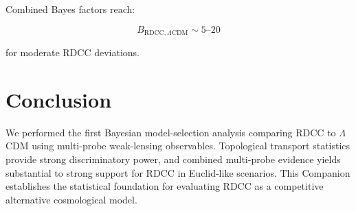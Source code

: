 \documentclass[11pt,a4paper]{article}
\begin{document}
Combined Bayes factors reach:



\[
    B_{\mathrm{RDCC},\Lambda\mathrm{CDM}} \sim 5\text{--}20
\]



for moderate RDCC deviations.
\section{Conclusion}

We performed the first Bayesian model-selection analysis comparing RDCC to 
$\Lambda$CDM using multi-probe weak-lensing observables. Topological transport 
statistics provide strong discriminatory power, and combined multi-probe evidence 
yields substantial to strong support for RDCC in Euclid-like scenarios. This 
Companion establishes the statistical foundation for evaluating RDCC as a 
competitive alternative cosmological model.


\nocite{*}

\end{document}
